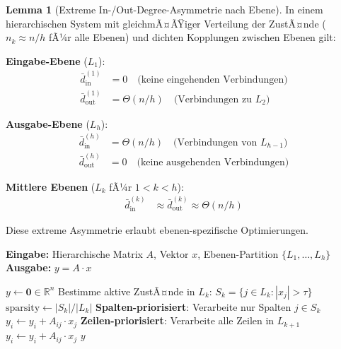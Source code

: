 ﻿\documentclass[a4paper,12pt]{report}
\theoremstyle{definition}
\newtheorem{lemma}{Lemma}
\begin{document}
	\begin{lemma}[Extreme In-/Out-Degree-Asymmetrie nach Ebene]
		In einem hierarchischen System mit gleichmÃ¤ÃŸiger Verteilung der ZustÃ¤nde ($n_k \approx n/h$ fÃ¼r alle Ebenen) und dichten Kopplungen zwischen Ebenen gilt:
		
		\textbf{Eingabe-Ebene} ($L_1$):
		\begin{align}
			\bar{d}_{\text{in}}^{(1)} &= 0 \quad \text{(keine eingehenden Verbindungen)} \\
			\bar{d}_{\text{out}}^{(1)} &= \Theta(n/h) \quad \text{(Verbindungen zu } L_2\text{)}
		\end{align}
		
		\textbf{Ausgabe-Ebene} ($L_h$):
		\begin{align}
			\bar{d}_{\text{in}}^{(h)} &= \Theta(n/h) \quad \text{(Verbindungen von } L_{h-1}\text{)} \\
			\bar{d}_{\text{out}}^{(h)} &= 0 \quad \text{(keine ausgehenden Verbindungen)}
		\end{align}
		
		\textbf{Mittlere Ebenen} ($L_k$ fÃ¼r $1 < k < h$):
		\begin{align}
			\bar{d}_{\text{in}}^{(k)} &\approx \bar{d}_{\text{out}}^{(k)} \approx \Theta(n/h)
		\end{align}
	\end{lemma}
	
	Diese extreme Asymmetrie erlaubt ebenen-spezifische Optimierungen.
	
	\begin{algorithm}[H]
		\caption{Ebenen-adaptive Matrix-Vektor-Multiplikation}
		\label{alg:layer-adaptive}
		\textbf{Eingabe:} Hierarchische Matrix $A$, Vektor $x$, Ebenen-Partition $\{L_1, \ldots, L_h\}$ \\
		\textbf{Ausgabe:} $y = A \cdot x$
		\begin{algorithmic}[1]
			\State $y \gets \mathbf{0} \in \mathbb{R}^n$
			\State Bestimme aktive ZustÃ¤nde in $L_k$: $S_k = \{j \in L_k : |x_j| > \tau\}$
			\State $\text{sparsity} \gets |S_k| / |L_k|$
			\State \textbf{Spalten-priorisiert}: Verarbeite nur Spalten $j \in S_k$
			\State $y_i \gets y_i + A_{ij} \cdot x_j$
			\EndFor
			\EndFor
			\Else
			\State \textbf{Zeilen-priorisiert}: Verarbeite alle Zeilen in $L_{k+1}$
			\State $y_i \gets y_i + A_{ij} \cdot x_j$
			\EndFor
			\EndFor
			\EndIf
			\EndFor
			\State \Return $y$
		\end{algorithmic}
	\end{algorithm}
	
\end{document}
